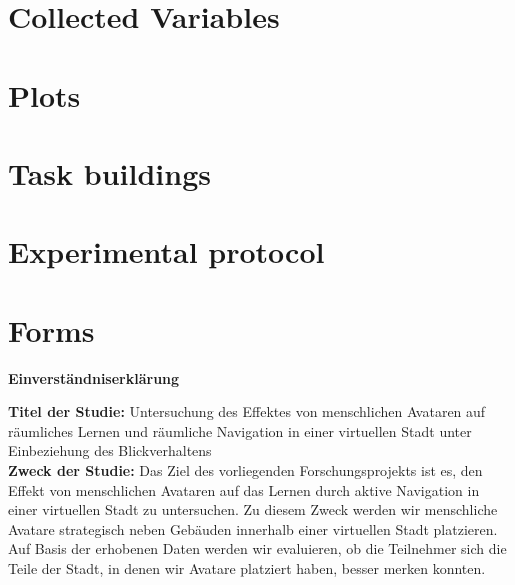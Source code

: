 \chapter{Collected Variables}\label{appx:variables}%


\chapter{Plots}\label{appx:plots}


\chapter{Task buildings}\label{appx:shop}


\chapter{Experimental protocol}\label{appx:protocol}


\chapter{Forms}\label{appx:forms}

\begin{center}
	\LARGE{\textbf{Einverständniserklärung}} \\
\end{center}


\textbf{Titel der Studie:} Untersuchung des Effektes von menschlichen Avataren auf räumliches Lernen und räumliche Navigation in einer virtuellen Stadt unter Einbeziehung des Blickverhaltens \\

\textbf{Zweck der Studie:} Das Ziel des vorliegenden Forschungsprojekts ist es, den Effekt von menschlichen Avataren auf das Lernen durch aktive Navigation in einer virtuellen Stadt zu untersuchen. Zu diesem Zweck werden wir menschliche Avatare strategisch neben Gebäuden innerhalb einer virtuellen Stadt platzieren. Auf Basis der erhobenen Daten werden wir evaluieren, ob die Teilnehmer sich die Teile der Stadt, in denen wir Avatare platziert haben, besser merken konnten. \\

